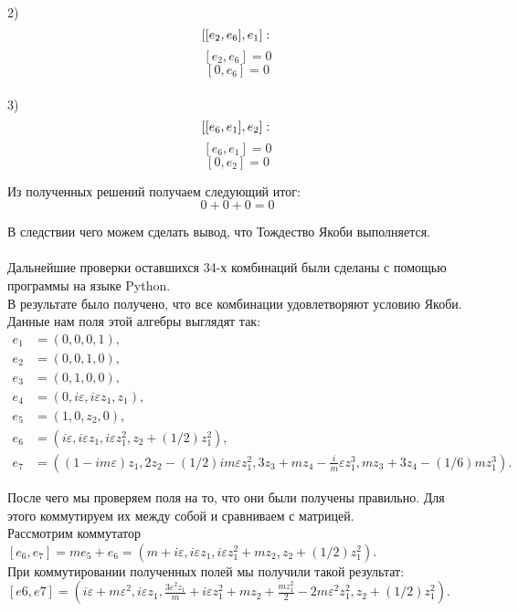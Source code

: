 \documentclass[12pt]{article}
\begin{document}
2)
\[
[[e_2, e_6], e_1]: \\
\]
\[
[e_2, e_6] = 0
\]
\[
[0, e_6] = 0 
\] \\

3) 
\[
[[e_6, e_1], e_2]: \\
\]
\[
[e_6, e_1] = 0 
\]
\[
[0, e_2] = 0 
\]

Из полученных решений получаем следующий итог:
\[
0 + 0 + 0 = 0
\]

В следствии чего можем сделать вывод, что Тождество Якоби выполняется. \\
\\
Дальнейшие проверки оставшихся 34-х комбинаций были сделаны с помощью программы на языке Python.
\\

В результате было получено, что все комбинации удовлетворяют условию Якоби.\\

Данные нам поля этой алгебры выглядят так:
\begin{align*}
e_1 &= (0,0,0,1), \\
e_2 &= (0,0,1,0), \\
e_3 &= (0,1,0,0),\\
e_4 &= (0, i \varepsilon, i \varepsilon z_1, z_1), \\
e_5 &= (1, 0, z_2, 0), \\
e_6 &= (i \varepsilon, i \varepsilon z_1, i \varepsilon z_1^2, z_2 + (1/2)z_1^2), \\
e_7 &= ((1 - i m \varepsilon) z_1, 2 z_2 - (1/2) i m \varepsilon z_1^2, 3 z_3 + m z_4 - \frac{i}{m} \varepsilon z_1^3, m z_3 + 3 z_4 - (1/6) m z_1^3). 
\end{align*} 

После чего мы проверяем поля на то, что они были получены правильно. Для этого коммутируем их между собой и сравниваем с матрицей. \\

Рассмотрим коммутатор $[e_6, e_7] = me_5 + e_6 = (m + i \varepsilon, i \varepsilon z_1, i \varepsilon z_1^2 + mz_2, z_2 + (1/2)z_1^2)$. \\

При коммутировании полученных полей мы получили такой результат: \\

$[e6, e7] = \left(i \varepsilon + m \varepsilon^2, i \varepsilon z_1, \frac{3 \varepsilon^2 z_1}{m} + i \varepsilon z_1^2 + m z_2 + \frac{m z_1^2}{2} - 2 m \varepsilon^2 z_1^2, z_2 + (1/2)z_1^2 \right)$. \\
\end{document}

